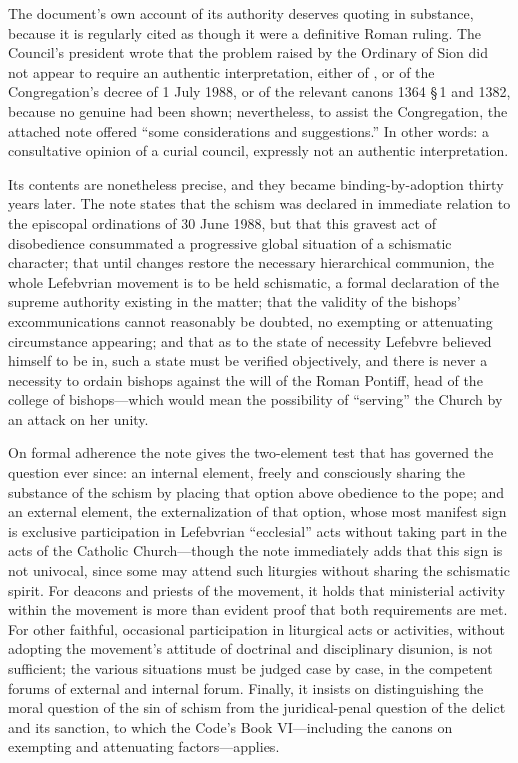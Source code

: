 The document's own account of its authority deserves quoting in
substance, because it is regularly cited as though it were a definitive
Roman ruling. The Council's president wrote that the problem raised by
the Ordinary of Sion did not appear to require an authentic
interpretation, either of , or of the Congregation's
decree of 1 July 1988, or of the relevant canons 1364 \S\,1 and 1382,
because no genuine  had been shown; nevertheless, to
assist the Congregation, the attached note offered ``some considerations
and suggestions.'' In other words: a consultative opinion of a curial
council, expressly not an authentic interpretation.

Its contents are nonetheless precise, and they became binding-by-adoption
thirty years later. The note states that the schism was declared in
immediate relation to the episcopal ordinations of 30 June 1988, but that
this gravest act of disobedience consummated a progressive global
situation of a schismatic character; that until changes restore the
necessary hierarchical communion, the whole Lefebvrian movement is to be
held schismatic, a formal declaration of the supreme authority existing in
the matter; that the validity of the bishops' excommunications cannot
reasonably be doubted, no exempting or attenuating circumstance appearing;
and that as to the state of necessity Lefebvre believed himself to be in,
such a state must be verified objectively, and there is never a necessity
to ordain bishops against the will of the Roman Pontiff, head of the
college of bishops---which would mean the possibility of ``serving'' the
Church by an attack on her unity.

On formal adherence the note gives the two-element test that has governed
the question ever since: an internal element, freely and consciously
sharing the substance of the schism by placing that option above obedience
to the pope; and an external element, the externalization of that option,
whose most manifest sign is exclusive participation in Lefebvrian
``ecclesial'' acts without taking part in the acts of the Catholic
Church---though the note immediately adds that this sign is not
univocal, since some may attend such liturgies without sharing the
schismatic spirit. For deacons and priests of the movement, it holds that
ministerial activity within the movement is more than evident proof that
both requirements are met. For other faithful, occasional participation
in liturgical acts or activities, without adopting the movement's
attitude of doctrinal and disciplinary disunion, is not sufficient; the
various situations must be judged case by case, in the competent forums
of external and internal forum. Finally, it insists on distinguishing the
moral question of the sin of schism from the juridical-penal question of
the delict and its sanction, to which the Code's Book VI---including the
canons on exempting and attenuating factors---applies.

